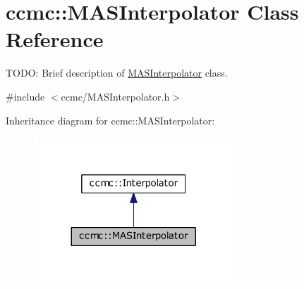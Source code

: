 \hypertarget{classccmc_1_1_m_a_s_interpolator}{\section{ccmc\-:\-:M\-A\-S\-Interpolator Class Reference}
\label{classccmc_1_1_m_a_s_interpolator}
}


T\-O\-D\-O\-: Brief description of \hyperlink{classccmc_1_1_m_a_s_interpolator}{M\-A\-S\-Interpolator} class.  




{\ttfamily \#include $<$ccmc/\-M\-A\-S\-Interpolator.\-h$>$}



Inheritance diagram for ccmc\-:\-:M\-A\-S\-Interpolator\-:\nopagebreak
\begin{figure}[H]
\begin{center}
\leavevmode
\includegraphics[width=212pt]{classccmc_1_1_m_a_s_interpolator__inherit__graph}
\end{center}
\end{figure}


